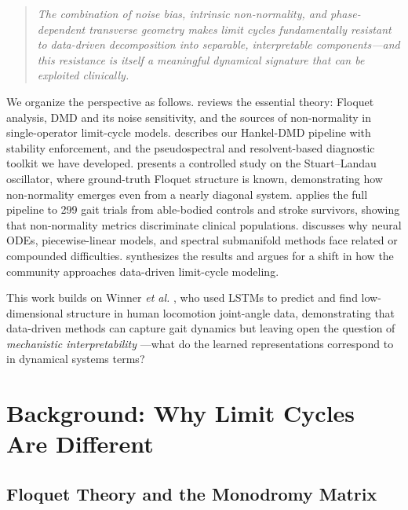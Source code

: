 \documentclass[12pt]{article}
\begin{document}
\begin{quote}
\emph{The combination of noise bias, intrinsic non-normality, and
phase-dependent transverse geometry makes limit cycles fundamentally
resistant to data-driven decomposition into separable, interpretable
components---and this resistance is itself a meaningful dynamical signature
that can be exploited clinically.}
\end{quote}

We organize the perspective as follows.
 reviews the essential theory: Floquet analysis,
DMD and its noise sensitivity, and the sources of non-normality in
single-operator limit-cycle models.
 describes our Hankel-DMD pipeline with stability
enforcement, and the pseudospectral and resolvent-based diagnostic toolkit
we have developed.
 presents a controlled study on the Stuart--Landau
oscillator, where ground-truth Floquet structure is known, demonstrating
how non-normality emerges even from a nearly diagonal system.
 applies the full pipeline to 299 gait trials
from able-bodied controls and stroke survivors, showing that non-normality
metrics discriminate clinical populations.
 discusses why neural ODEs, piecewise-linear
models, and spectral submanifold methods face related or compounded
difficulties.
 synthesizes the results and argues for a shift
in how the community approaches data-driven limit-cycle modeling.

This work builds on Winner \emph{et al.} \citep{winner2023lstm}, who used
LSTMs to predict and find low-dimensional structure in human locomotion
joint-angle data, demonstrating that data-driven methods can capture gait
dynamics but leaving open the question of \emph{mechanistic interpretability}
---what do the learned representations correspond to in dynamical systems
terms?

\section{Background: Why Limit Cycles Are Different}
\label{sec:background}

\subsection{Floquet Theory and the Monodromy Matrix}
\label{sec:floquet}
\end{document}
